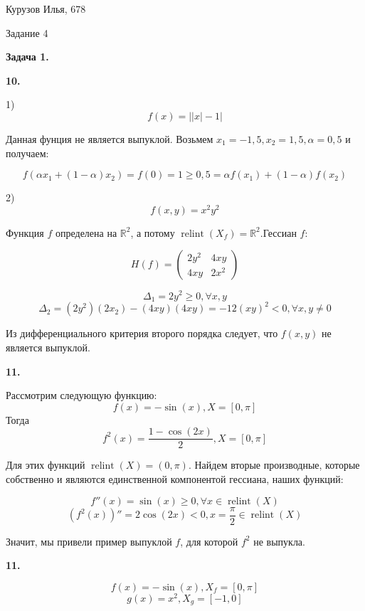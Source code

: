 \documentclass[12pt]{article}
\DeclareMathOperator*{\relint}{relint}
\newcommand\abs[1]{\left|#1\right|}
\begin{document}
\begin{center}
	{Курузов Илья, 678}

	{Задание 4}
\end{center}

\begin{center}
	\textbf{Задача 1.}
\end{center}

\begin{center}
	\textbf{10.}
\end{center}

1) $$f(x) =\abs{\abs{x}-1}$$

Данная фунция не является выпуклой. Возьмем $x_1 = -1{,}5,x_2=1{,}5,\alpha =0{,}5$ и получаем:

$$f( \alpha x_1 + (1-\alpha)x_2) = f(0) = 1 \geq 0{,}5 = \alpha f(x_1)+(1-\alpha)f(x_2)$$

2) $$f(x,y) = x^2y^2$$

Функция $f$ определена на $\mathbb{R}^2$, а потому $\relint(X_f) = \mathbb{R}^2$.Гессиан $f$:

$$H(f) = \begin{pmatrix} 2y^2 & 4xy \\ 4xy & 2x^2 \end{pmatrix}$$

$$\Delta_1 = 2y^2 \geq 0, \forall x,y$$
$$\Delta_2 = (2y^2)(2x_2)-(4xy)(4xy)=-12(xy)^2 < 0, \forall x,y \neq 0$$

Из дифференциального критерия второго порядка следует, что $f(x,y)$ не является выпуклой.

\begin{center}
	\textbf{11.}
\end{center}

Рассмотрим следующую функцию:
$$f(x) = -\sin(x), X = [0, \pi]$$
Тогда
$$f^2(x) = \frac{1-\cos(2x)}{2}, X = [0, \pi]$$

Для этих функций $\relint(X) = (0, \pi)$. Найдем вторые производные, которые собственно и являются единственной компонентой гессиана, наших функций:

$$f''(x) = \sin(x) \geq 0, \forall x \in \relint(X)$$
$$(f^2(x))''= 2\cos(2x) < 0, x = \frac{\pi}{2} \in \relint(X)$$

Значит, мы привели пример выпуклой $f$, для которой $f^2$ не выпукла.

\begin{center}
	\textbf{11.}
\end{center}

$$f(x) = -\sin(x), X_f = [0, \pi]$$
$$g(x) = x^2, X_g = [-1, 0]$$
\end{document}
